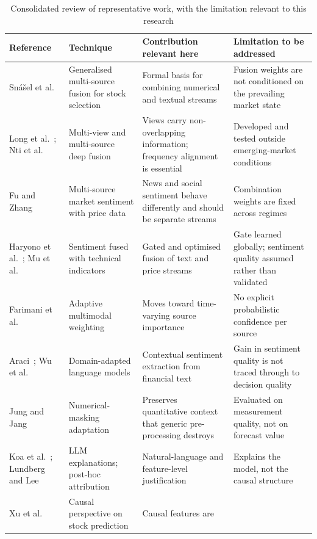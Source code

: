 \begin{table}[!htb]
\centering
\caption[Consolidated review of representative work]{Consolidated review of representative work,
with the limitation relevant to this research}
\label{tab:lit}
\tabfonts
\begin{tabular}{@{}L{2.5cm}L{3.3cm}L{3.9cm}L{4.1cm}@{}}
\toprule
\textbf{Reference} & \textbf{Technique} & \textbf{Contribution relevant here} &
\textbf{Limitation to be addressed} \\
\midrule
Snášel et al.~\cite{snasel2024} & Generalised multi-source fusion for stock selection & Formal
basis for combining numerical and textual streams & Fusion weights are not conditioned on the
prevailing market state \\
Long et al.~\cite{long2024}; Nti et al.~\cite{nti2021} & Multi-view and multi-source deep
fusion & Views carry non-overlapping information; frequency alignment is essential & Developed
and tested outside emerging-market conditions \\
Fu and Zhang~\cite{fu2024} & Multi-source market sentiment with price data & News and social
sentiment behave differently and should be separate streams & Combination weights are fixed
across regimes \\
Haryono et al.~\cite{haryono2023}; Mu et al.~\cite{mu2023investor} & Sentiment fused with
technical indicators & Gated and optimised fusion of text and price streams & Gate learned
globally; sentiment quality assumed rather than validated \\
Farimani et al.~\cite{farimani2024} & Adaptive multimodal weighting & Moves toward time-varying
source importance & No explicit probabilistic confidence per source \\
Araci~\cite{araci2019}; Wu et al.~\cite{wu2023bloomberggpt} & Domain-adapted language models &
Contextual sentiment extraction from financial text & Gain in sentiment quality is not traced
through to decision quality \\
Jung and Jang~\cite{jung2024} & Numerical-masking adaptation & Preserves quantitative context
that generic pre-processing destroys & Evaluated on measurement quality, not on forecast value
\\
Koa et al.~\cite{koa2024}; Lundberg and Lee~\cite{lundberg2017} & LLM explanations; post-hoc
attribution & Natural-language and feature-level justification & Explains the model, not the
causal structure \\
Xu et al.~\cite{xu2026causal} & Causal perspective on stock prediction & Causal features are

\end{tabular}
\end{table}
